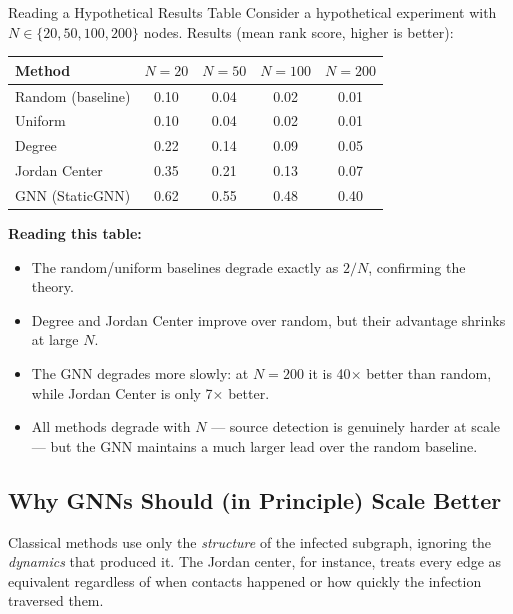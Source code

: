 \begin{examplebox}{Reading a Hypothetical Results Table}
Consider a hypothetical experiment with $N \in \{20, 50, 100, 200\}$ nodes. Results (mean rank score, higher is better):

\begin{center}
\begin{tabular}{lcccc}
\toprule
\textbf{Method}      & $N=20$ & $N=50$ & $N=100$ & $N=200$ \\
\midrule
Random (baseline)    & 0.10   & 0.04   & 0.02    & 0.01    \\
Uniform              & 0.10   & 0.04   & 0.02    & 0.01    \\
Degree               & 0.22   & 0.14   & 0.09    & 0.05    \\
Jordan Center        & 0.35   & 0.21   & 0.13    & 0.07    \\
GNN (StaticGNN)      & 0.62   & 0.55   & 0.48    & 0.40    \\
\bottomrule
\end{tabular}
\end{center}

\textbf{Reading this table:}
\begin{itemize}
    \item The random/uniform baselines degrade exactly as $2/N$, confirming the theory.
    \item Degree and Jordan Center improve over random, but their advantage shrinks at large $N$.
    \item The GNN degrades more slowly: at $N=200$ it is 40$\times$ better than random, while Jordan Center is only 7$\times$ better.
    \item All methods degrade with $N$ --- source detection is genuinely harder at scale --- but the GNN maintains a much larger lead over the random baseline.
\end{itemize}
\end{examplebox}

\subsection{Why GNNs Should (in Principle) Scale Better}

Classical methods use only the \emph{structure} of the infected subgraph, ignoring the \emph{dynamics} that produced it. The Jordan center, for instance, treats every edge as equivalent regardless of when contacts happened or how quickly the infection traversed them.

